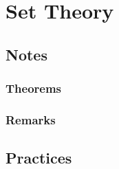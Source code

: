 \section{Set Theory}
\subsection{Notes}
\subsubsection{Theorems}

\subsubsection{Remarks}

\subsection{Practices}